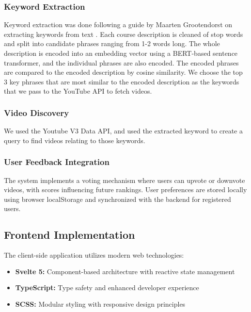 \documentclass[manuscript,nonacm]{acmart}
\begin{document}
\subsubsection{Keyword Extraction}
Keyword extraction was done following a guide by Maarten Grootendorst on extracting keywords from text \cite{Grootendorst}. Each course description is cleaned of stop words and split into candidate phrases ranging from 1-2 words long. The whole description is encoded into an embedding vector using a BERT-based sentence transformer, and the individual phrases are also encoded. The encoded phrases are compared to the encoded description by cosine similarity. We choose the top 3 key phrases that are most similar to the encoded description as the keywords that we pass to the YouTube API to fetch videos.

\subsubsection{Video Discovery}
We used the Youtube V3 Data API, and used the extracted keyword to create a query to find videos relating to those keywords.


\subsubsection{User Feedback Integration}
The system implements a voting mechanism where users can upvote or downvote videos, with scores influencing future rankings. User preferences are stored locally using browser localStorage and synchronized with the backend for registered users.

\subsection{Frontend Implementation}

The client-side application utilizes modern web technologies:

\begin{itemize}
    \item \textbf{Svelte 5:} Component-based architecture with reactive state management
    \item \textbf{TypeScript:} Type safety and enhanced developer experience
    \item \textbf{SCSS:} Modular styling with responsive design principles
\end{itemize}
\end{document}

